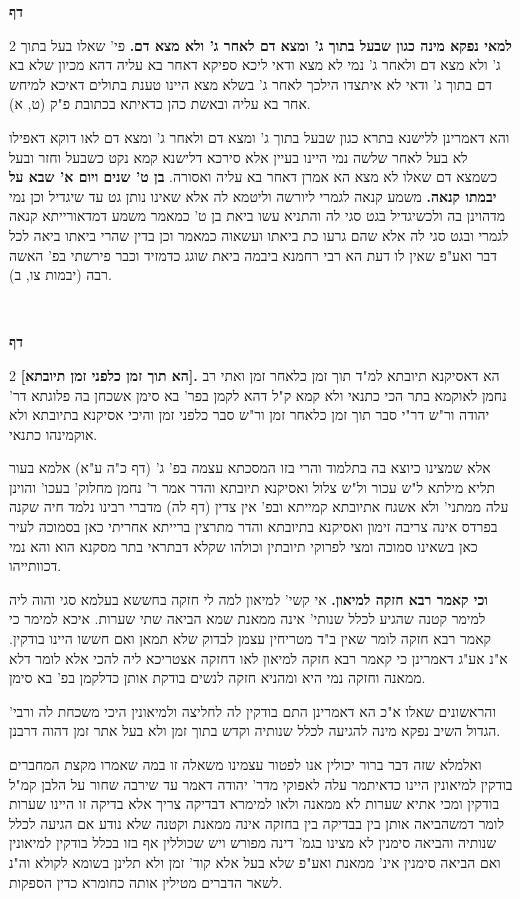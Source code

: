 \documentclass[12pt, openany]{book}
\newcommand{\sethebfont}{
\fontsize{10.5pt}{21.0pt} \selectfont
}
\newcommand{\twocol}[1]{
	{\sethebfont \begin{multicols}{2}
			#1
	\end{multicols}}	
}
\newcommand{\textblock}[1]{
{\sethebfont #1\\}	
}
\newcommand{\chapname}{}
\newcommand{\newchap}[1]{
	\addcontentsline{toc}{chapter}{#1}
	\renewcommand{\chapname}{#1}
		\begin{center}
			\textbf{%
\fontsize{16pt}{16pt}\selectfont
				#1}
		\end{center}
}
\begin{document}
\newchap{דף }
\twocol{\textbf{למאי נפקא מינה כגון שבעל בתוך ג' ומצא דם לאחר ג' ולא מצא דם.}  פי' שאלו בעל בתוך ג' ולא מצא דם ולאחר ג' נמי לא מצא ודאי ליכא ספיקא דאחר בא עליה דהא מכיון שלא בא דם בתוך ג' ודאי לא איתצדו הילכך לאחר ג' בשלא מצא היינו טענת בתולים דאיכא למיחש אחר בא עליה ובאשת כהן כדאיתא בכתובת פ"ק (ט, א).\par  והא דאמרינן ללישנא בתרא כגון שבעל בתוך ג' ומצא דם ולאחר ג' ומצא דם לאו דוקא דאפילו לא בעל לאחר שלשה נמי היינו בעיין אלא סירכא דלישנא קמא נקט כשבעל וחזר ובעל כשמצא דם שאלו לא מצא הא אמרן דאחר בא עליה ואסורה. 
\parמדתנן \textbf{בן ט' שנים ויום א' שבא על יבמתו קנאה.}  משמע קנאה לגמרי ליורשה וליטמא לה אלא שאינו נותן גט עד שיגדיל וכן נמי מדהוינן בה ולכשיגדיל בגט סגי לה והתניא עשו ביאת בן ט' כמאמר משמע דמדאורייתא קנאה לגמרי ובגט סגי לה אלא שהם גרעו כת ביאתו ועשאוה כמאמר וכן בדין שהרי ביאתו ביאה לכל דבר ואע"פ שאין לו דעת הא רבי רחמנא ביבמה ביאת שוגג כדמזיד וכבר פירשתי בפ' האשה רבה (יבמות צו, ב). 
\par}
\textblock{}{}
\newchap{דף }
\twocol{\textbf{[הא תוך זמן כלפני זמן תיובתא].}  הא דאסיקנא תיובתא למ"ד תוך זמן כלאחר זמן ואתי רב נחמן לאוקמא בתר הכי כתנאי ולא קמא ק"ל דהא לקמן בפר' בא סימן אשכחן בה פלוגתא דר' יהודה ור"ש דר"י סבר תוך זמן כלאחר זמן ור"ש סבר כלפני זמן והיכי אסיקנא בתיובתא ולא אוקמינהו כתנאי.\par  אלא שמצינו כיוצא בה בתלמוד והרי בזו המסכתא עצמה בפ' ג' (דף כ"ה ע"א) אלמא בעור תליא מילתא ל"ש עכור ול"ש צלול ואסיקנא תיובתא והדר אמר ר' נחמן מחלוק' בעכו' והוינן עלה ממתני' ולא אשגח אתיובתא קמייתא ובפ' אין צדין (דף לה) מדברי רבינו נלמד חיה שקנה בפרדס אינה צריבה זימון ואסיקנא בתיובתא והדר מתרצין ברייתא אחריתי כאן בסמוכה לעיר כאן בשאינו סמוכה ומצי לפרוקי תיובתין וכולהו שקלא דבתראי בתר מסקנא הוא והא נמי דכוותייהו. 
\par\textbf{וכי קאמר רבא חזקה למיאון.}  אי קשי' למיאון למה לי חזקה בחששא בעלמא סגי והוה ליה למימר קטנה שהגיע לכלל שנותי' אינה ממאנת שמא הביאה שתי שערות. איכא למימר כי קאמר רבא חזקה לומר שאין ב"ד מטריחין עצמן לבדוק שלא תמאן ואם חששו היינו בודקין. א"נ אע"ג דאמרינן כי קאמר רבא חזקה למיאון לאו דחזקה אצטריכא ליה להכי אלא לומר דלא ממאנה וחזקה נמי היא ומהניא חזקה לנשים בודקת אותן כדלקמן בפ' בא סימן.\par והראשונים שאלו א"כ הא דאמרינן התם בודקין לה לחליצה ולמיאונין היכי משכחת לה ורבי' הגדול השיב נפקא מינה להגיעה לכלל שנותיה וקדש בתוך זמן ולא בעל אתר זמן דהוה דרבנן.\par  ואלמלא שזה דבר ברור יכולין אנו לפטור עצמינו משאלה זו במה שאמרו מקצת המחברים בודקין למיאונין היינו כדאיתמר עלה לאפוקי מדר' יהודה דאמר עד שירבה שחור על הלבן קמ"ל בודקין ומכי אתיא שערות לא ממאנה ולאו למימרא דבדיקה צריך אלא בדיקה זו היינו שערות לומר דמשהביאה אותן בין בבדיקה בין בחזקה אינה ממאנת וקטנה שלא נודע אם הגיעה לכלל שנותיה והביאה סימנין לא מצינו בגמ' דינה מפורש ויש שכוללין אף בזו בכלל בודקין למיאונין ואם הביאה סימנין אינ' ממאנת ואע"פ שלא בעל אלא קוד' זמן ולא תלינן בשומא לקולא וה"נ לשאר הדברים מטילין אותה כחומרא כדין הספקות. 
\par}
\end{document}
